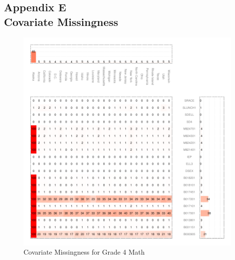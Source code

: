 \documentclass[letterpaper,12p,twoside]{article} %
\begin{document}
{\begin{singlespace}
 \clearpage
 \clearpage

 \clearpage
 \clearpage

\end{singlespace}

\clearpage
{}
\subsection*{Appendix E\\Covariate Missingness}
\label{appendixmissing}

\begin{figure}[h]
\begin{center}
\includegraphics[width=\textwidth]{../Figures2009/g4math-missing.pdf}
\caption{Covariate Missingness for Grade 4 Math}
\label{fig:g4math:missing}
\end{center}
\end{figure}

}
\end{document}
